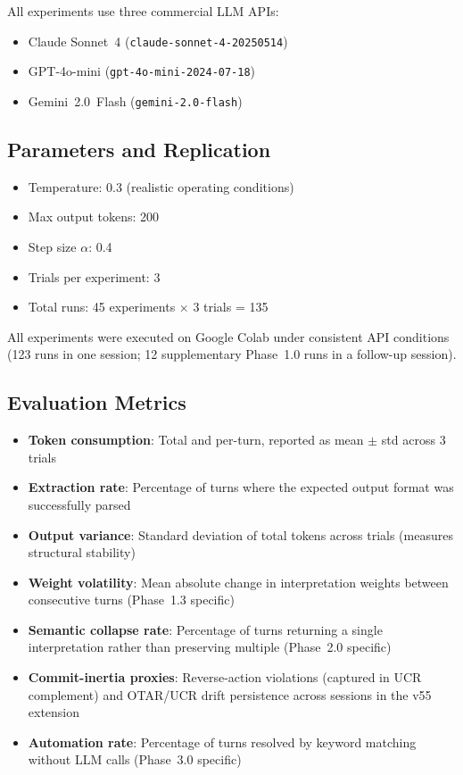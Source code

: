 \documentclass[11pt,a4paper]{article}
\begin{document}
All experiments use three commercial LLM APIs:
\begin{itemize}
    \item Claude Sonnet~4 (\texttt{claude-sonnet-4-20250514})
    \item GPT-4o-mini (\texttt{gpt-4o-mini-2024-07-18})
    \item Gemini~2.0~Flash (\texttt{gemini-2.0-flash})
\end{itemize}

\subsection{Parameters and Replication}

\begin{itemize}
    \item Temperature: 0.3 (realistic operating conditions)
    \item Max output tokens: 200
    \item Step size $\alpha$: 0.4
    \item Trials per experiment: 3
    \item Total runs: 45 experiments $\times$ 3 trials = 135
\end{itemize}

All experiments were executed on Google Colab under consistent API conditions
(123 runs in one session; 12 supplementary Phase~1.0 runs in a follow-up session).

\subsection{Evaluation Metrics}

\begin{itemize}
    \item \textbf{Token consumption}: Total and per-turn, reported as mean $\pm$ std
    across 3 trials
    \item \textbf{Extraction rate}: Percentage of turns where the expected output
    format was successfully parsed
    \item \textbf{Output variance}: Standard deviation of total tokens across trials
    (measures structural stability)
    \item \textbf{Weight volatility}: Mean absolute change in interpretation weights
    between consecutive turns (Phase~1.3 specific)
    \item \textbf{Semantic collapse rate}: Percentage of turns returning a single
    interpretation rather than preserving multiple (Phase~2.0 specific)
    \item \textbf{Commit-inertia proxies}: Reverse-action violations (captured in
    UCR complement) and OTAR/UCR drift persistence across sessions in the v55 extension
    \item \textbf{Automation rate}: Percentage of turns resolved by keyword matching
    without LLM calls (Phase~3.0 specific)
\end{itemize}
\end{document}
